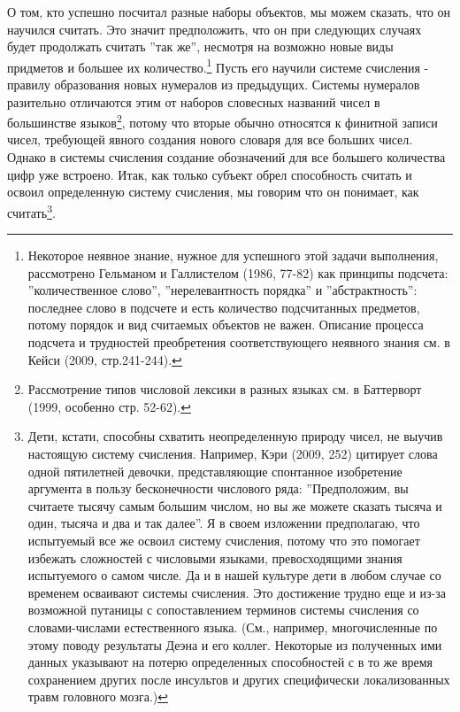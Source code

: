 \documentclass[12pt]{book}
\begin{document}
О том, кто успешно посчитал разные наборы объектов, мы можем сказать, что он научился считать. Это значит предположить, что он при следующих случаях будет продолжать считать ''так же'', несмотря на возможно новые виды придметов и большее их количество.\footnote{Некоторое неявное знание, нужное для успешного этой задачи выполнения, рассмотрено Гельманом и Галлистелом (1986, 77-82) как принципы подсчета: ''количественное слово'', ''нерелевантность порядка'' и ''абстрактность'': последнее слово в подсчете и есть количество подсчитанных предметов, потому порядок и вид считаемых объектов не важен. Описание процесса подсчета и трудностей преобретения соответствующего неявного знания см. в Кейси (2009, стр.241-244).} Пусть его научили системе счисления - правилу образования новых нумералов из предыдущих. Системы нумералов разительно отличаются этим от наборов словесных названий чисел в большинстве языков\footnote{Рассмотрение типов числовой лексики в разных языках см. в Баттерворт (1999, особенно стр. 52-62).}, потому что вторые обычно относятся к финитной записи чисел, требующей явного создания нового словаря для все больших чисел. Однако в системы счисления создание обозначений для все большего количества цифр уже встроено. Итак, как только субъект обрел способность считать и освоил определенную систему счисления, мы говорим что он понимает, как считать\footnote{Дети, кстати, способны схватить неопределенную природу чисел, не выучив настоящую систему счисления. Например, Кэри (2009, 252) цитирует слова одной пятилетней девочки, представляющие спонтанное изобретение аргумента в пользу бесконечности числового ряда: ''Предположим, вы считаете тысячу самым большим числом, но вы же можете сказать тысяча и один, тысяча и два и так далее''. Я в своем изложении предполагаю, что испытуемый все же освоил систему счисления, потому что это помогает избежать сложностей с числовыми языками, превосходящими знания испытуемого о самом числе. Да и в нашей культуре дети в любом случае со временем осваивают системы счисления. Это достижение трудно еще и из-за возможной путаницы с сопоставлением терминов системы счисления со словами-числами естественного языка. (См., например, многочисленные по этому поводу результаты Деэна и его коллег. Некоторые из полученных ими данных указывают на потерю определенных способностей с в то же время сохранением других после инсультов и других специфически локализованных травм головного мозга.)}.
\end{document}
